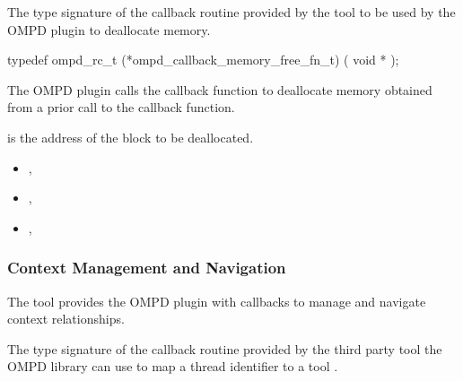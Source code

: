 \label{ompd:ompd_callback_memory_free_fn_t}

\summary
The type signature of the callback routine provided by the 
tool to be used by the OMPD plugin to deallocate memory.


\cspecificstart
\begin{ompSyntax}
typedef ompd_rc_t (*ompd_callback_memory_free_fn_t) (
  void *
);
\end{ompSyntax}
\cspecificend

\descr
The OMPD plugin calls the  callback function to 
deallocate memory obtained from a prior call to the  
callback function.

\argdesc
{} is the address of the block to be deallocated.

\crossreferences
\begin{itemize}
\item
  , 
\item
  , 
\item
  , 
\end{itemize}

\subsubsection{Context Management and Navigation}

The tool provides the OMPD plugin with callbacks
to manage and navigate context relationships.

\label{ompd:ompd_callback_get_thread_context_for_thread_id_fn_t}

\summary
The type signature of the callback routine provided by the 
third party tool the OMPD library can use to map a
thread identifier to a tool .


